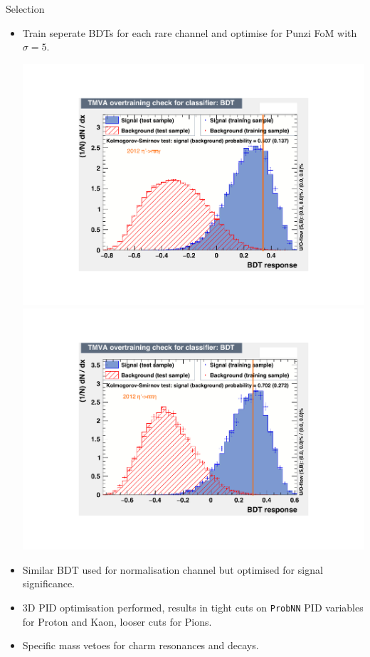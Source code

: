 \documentclass{beamer}
\def\EtapPiPiG   {\decay{\etapr}{\pip\pim\gamma}\xspace}
\def\EtapPiPiEta {\decay{\etapr}{\pip\pim\Peta}\xspace}
\begin{document}
\begin{frame}{Selection}
  \small
  \begin{itemize}
  \item Train seperate BDTs for each rare channel and optimise for Punzi FoM with $\sigma=5$.
    \begin{center}
      \includegraphics[width=.41\textwidth]{2012IOPpipig.pdf}
      \includegraphics[width=.41\textwidth]{pipieta12IOP.pdf}
    \end{center}
  \item Similar BDT used for normalisation channel but optimised for signal significance.
  \item 3D PID optimisation performed, results in tight cuts on \texttt{ProbNN} PID variables for Proton and Kaon, looser cuts for Pions.
  \item Specific mass vetoes for charm resonances and \decay{\Lb}{\proton \Km \pip \pim} decays.

  \end{itemize}
\end{frame}
\end{document}

